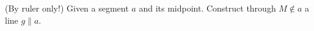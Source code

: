 (By ruler only!) Given a segment $a$ and its midpoint. Construct through $M \notin a$ a line $g \parallel a$.
